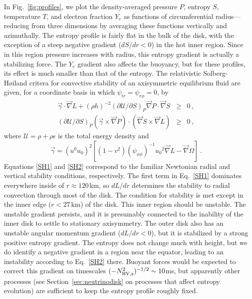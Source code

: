 In Fig.~\ref{fig:profiles}, we plot the density-averaged pressure $P$,
entropy $S$, temperature $T$, and electron fraction $Y_e$ as functions
of circumferential radius---reducing from three dimensions by averaging
these functions vertically and azimuthally.
The entropy profile is fairly flat in
the bulk of the disk, with the exception of a steep negative gradient
($dS/dr<0$) 
in the hot inner region.  Since in this region pressure increases with
radius, this entropy gradient is actually a stabilizing force.  The $Y_e$
gradient also affects the
buoyancy,
but for these profiles,
its effect is much smaller than that of the entropy.  The relativistic
Solberg-H{\o}iland critera for convective stability of an axisymmetric
equilibrium fluid are given, for a coordinate basis in which
$\psi_{tr}=\psi_{r\phi}=0$, by \citep{segu1975-rot_stability}
\begin{eqnarray}
\label{SH1}
\vec{\gamma}\cdot\vec{\nabla} L + (\rho h)^{-2}(\partial\mathcal{U}/\partial S)_P
\vec{\nabla} P\cdot\vec{\nabla} S &\ge& 0\ , \\
\label{SH2}
(\partial\mathcal{U}/\partial S)_P(\vec{\gamma}\times\vec{\nabla}P)\cdot
(\vec{\nabla}S\times\vec{\nabla}L) &\ge& 0\ ,
\end{eqnarray}
where $\mathcal{U}=\rho+\rho\epsilon$ is the total energy density and
\begin{equation}
\vec{\gamma} = (u^0u_0)^2[(1-v^2)(\psi_{\phi\phi})^{-1}u_0{}^2\vec{\nabla}L
-\vec{\nabla}\Omega]\ .
\end{equation}
Equations \ref{SH1} and \ref{SH2} correspond to the familiar Newtonian
radial and vertical stability conditions, respectively. 
The first term in Eq.~\ref{SH1} dominates everywhere inside
of $r\approx 120$\,km, so $dL/dr$ determines the stability to radial convection
through most of the disk. 
The condition for stability is met except in the inner edge ($r<27$\,km)
of the disk.  This inner region should be unstable.  The unstable
gradient persists, and it is presumably connected to the inability
of the inner disk to settle to stationary axisymmetry.  The outer
disk also has an unstable angular momentum gradient ($dL/dr<0$), but
it is stabilized by a strong positive entropy gradient. 
The entropy does not change much with height, but we do
identify a negative gradient in a region near the equator, leading to
an instability according to Eq.~\ref{SH2} there.  Buoyant forces would be
expected
to correct this gradient on timescales $(-N_{\rm BV,z}^2)^{-1/2}\sim 10$ms, but
apparently other processes (see Section~\ref{sec:neutrinodisk} on processes
that affect entropy
evolution) are sufficient to keep the entropy profile roughly fixed.

